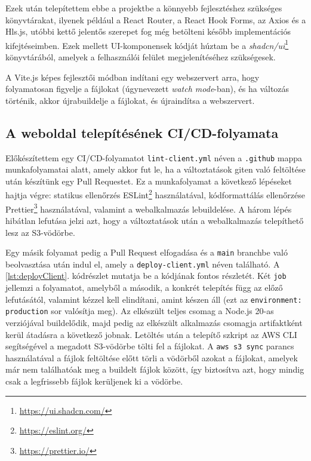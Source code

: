 Ezek után telepítettem ebbe a projektbe a könnyebb fejlesztéshez szükséges könyvtárakat, ilyenek például a React Router, a React Hook Forms, az Axios és a Hls.js, utóbbi kettő jelentős szerepet fog még betölteni később implementációs kifejtéseimben. Ezek mellett UI-komponensek kódját húztam be a \emph{shadcn/ui}\footnote{\url{https://ui.shadcn.com/}} könyvtárából, amelyek a felhasználói felület megjelenítéséhez szükségesek.

A Vite.js képes fejlesztői módban indítani egy webszervert arra, hogy folyamatosan figyelje a fájlokat (úgynevezett \emph{watch mode}-ban), és ha változás történik, akkor újrabuildelje a fájlokat, és újraindítsa a webszervert.

\subsection{A weboldal telepítésének CI/CD-folyamata}\label{sec:ciCd}

Előkészítettem egy CI/CD-folyamatot \verb|lint-client.yml| néven a \verb|.github| mappa munkafolyamatai alatt, amely akkor fut le, ha a változtatások giten való feltöltése után készítünk egy Pull Requestet. Ez a munkafolyamat a következő lépéseket hajtja végre: statikus ellenőrzés ESLint\footnote{\url{https://eslint.org/}} használatával, kódformattálás ellenőrzése Prettier\footnote{\url{https://prettier.io/}} használatával, valamint a webalkalmazás lebuildelése. A három lépés hibátlan lefutása jelzi azt, hogy a változtatások után a webalkalmazás telepíthető lesz az S3-vödörbe.

Egy másik folyamat pedig a Pull Request elfogadása és a \verb|main| branchbe való beolvasztása után indul el, amely a \verb|deploy-client.yml| néven található. A \ref{lst:deployClient}. kódrészlet mutatja be a kódjának fontos részletét. Két \verb|job| jellemzi a folyamatot, amelyből a második, a konkrét telepítés függ az előző lefutásától, valamint kézzel kell elindítani, amint készen áll (ezt az \verb|environment: production| sor valósítja meg). Az elkészült teljes csomag a Node.js 20-as verziójával buildelődik, majd pedig az elkészült alkalmazás csomagja artifaktként kerül átadásra a következő jobnak. Letöltés után a telepítő szkript az AWS CLI segítségével a megadott S3-vödörbe tölti fel a fájlokat. A \verb|aws s3 sync| parancs használatával a fájlok feltöltése előtt törli a vödörből azokat a fájlokat, amelyek már nem találhatóak meg a buildelt fájlok között, így biztosítva azt, hogy mindig csak a legfrissebb fájlok kerüljenek ki a vödörbe.

